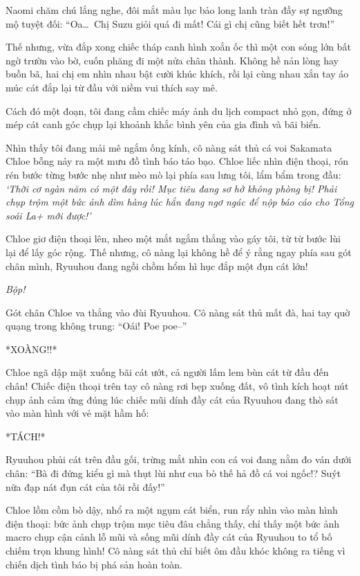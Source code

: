 \documentclass[../main.tex]{subfiles}
\begin{document}
Naomi chăm chú lắng nghe, đôi mắt màu lục bảo long lanh tràn đầy sự ngưỡng mộ tuyệt đối: ``Oa\dots\ Chị Suzu giỏi quá đi mất! Cái gì chị cũng biết hết trơn!''

Thế nhưng, vừa đắp xong chiếc tháp canh hình xoắn ốc thì một con sóng lớn bất ngờ trườn vào bờ, cuốn phăng đi một nửa chân thành. Không hề nản lòng hay buồn bã, hai chị em nhìn nhau bật cười khúc khích, rồi lại cùng nhau xắn tay áo múc cát đắp lại từ đầu với niềm vui thích say mê.

Cách đó một đoạn, tôi đang cầm chiếc máy ảnh du lịch compact nhỏ gọn, đứng ở mép cát canh góc chụp lại khoảnh khắc bình yên của gia đình và bãi biển.

Nhìn thấy tôi đang mải mê ngắm ống kính, cô nàng sát thủ cá voi Sakamata Chloe bỗng nảy ra một mưu đồ tình báo táo bạo. Chloe liếc nhìn điện thoại, rón rén bước từng bước nhẹ như mèo mò lại phía sau lưng tôi, lẩm bẩm trong đầu: \textit{`Thời cơ ngàn năm có một đây rồi! Mục tiêu đang sơ hở không phòng bị! Phải chụp trộm một bức ảnh dìm hàng lúc hắn đang ngơ ngác để nộp báo cáo cho Tổng soái La+ mới được!'}

Chloe giơ điện thoại lên, nheo một mắt ngắm thẳng vào gáy tôi, từ từ bước lùi lại để lấy góc rộng. Thế nhưng, cô nàng lại không hề để ý rằng ngay phía sau gót chân mình, Ryuuhou đang ngồi chồm hổm hì hục đắp một đụn cát lớn!

\textit{Bộp!}

Gót chân Chloe va thẳng vào đùi Ryuuhou. Cô nàng sát thủ mất đà, hai tay quờ quạng trong không trung: ``Oái! Poe poe--''

*XOÀNG!!*

Chloe ngã dập mặt xuống bãi cát ướt, cả người lấm lem bùn cát từ đầu đến chân! Chiếc điện thoại trên tay cô nàng rơi bẹp xuống đất, vô tình kích hoạt nút chụp ảnh cảm ứng đúng lúc chiếc mũi dính đầy cát của Ryuuhou đang thò sát vào màn hình với vẻ mặt hầm hố:

*TÁCH!*

Ryuuhou phủi cát trên đầu gối, trừng mắt nhìn con cá voi đang nằm đo ván dưới chân: ``Bà đi đứng kiểu gì mà thụt lùi như cua bò thế hả đồ cá voi ngốc!? Suýt nữa đạp nát đụn cát của tôi rồi đấy!''

Chloe lồm cồm bò dậy, nhổ ra một ngụm cát biển, run rẩy nhìn vào màn hình điện thoại: bức ảnh chụp trộm mục tiêu đâu chẳng thấy, chỉ thấy một bức ảnh macro chụp cận cảnh lỗ mũi và sống mũi dính đầy cát của Ryuuhou to tổ bố chiếm trọn khung hình! Cô nàng sát thủ chỉ biết ôm đầu khóc không ra tiếng vì chiến dịch tình báo bị phá sản hoàn toàn.
\end{document}
